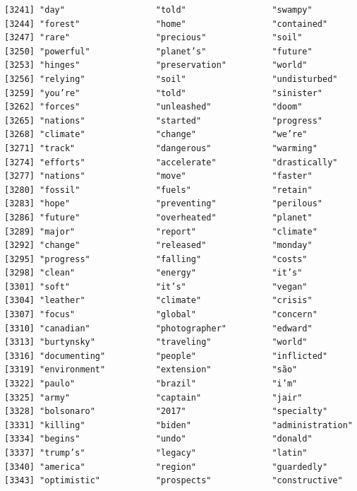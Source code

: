 \documentclass[
  letterpaper,
  DIV=11,
  numbers=noendperiod]{scrartcl}
\begin{document}
\begin{verbatim}
[3241] "day"                  "told"                 "swampy"              
[3244] "forest"               "home"                 "contained"           
[3247] "rare"                 "precious"             "soil"                
[3250] "powerful"             "planet’s"             "future"              
[3253] "hinges"               "preservation"         "world"               
[3256] "relying"              "soil"                 "undisturbed"         
[3259] "you’re"               "told"                 "sinister"            
[3262] "forces"               "unleashed"            "doom"                
[3265] "nations"              "started"              "progress"            
[3268] "climate"              "change"               "we’re"               
[3271] "track"                "dangerous"            "warming"             
[3274] "efforts"              "accelerate"           "drastically"         
[3277] "nations"              "move"                 "faster"              
[3280] "fossil"               "fuels"                "retain"              
[3283] "hope"                 "preventing"           "perilous"            
[3286] "future"               "overheated"           "planet"              
[3289] "major"                "report"               "climate"             
[3292] "change"               "released"             "monday"              
[3295] "progress"             "falling"              "costs"               
[3298] "clean"                "energy"               "it’s"                
[3301] "soft"                 "it’s"                 "vegan"               
[3304] "leather"              "climate"              "crisis"              
[3307] "focus"                "global"               "concern"             
[3310] "canadian"             "photographer"         "edward"              
[3313] "burtynsky"            "traveling"            "world"               
[3316] "documenting"          "people"               "inflicted"           
[3319] "environment"          "extension"            "são"                 
[3322] "paulo"                "brazil"               "i’m"                 
[3325] "army"                 "captain"              "jair"                
[3328] "bolsonaro"            "2017"                 "specialty"           
[3331] "killing"              "biden"                "administration"      
[3334] "begins"               "undo"                 "donald"              
[3337] "trump’s"              "legacy"               "latin"               
[3340] "america"              "region"               "guardedly"           
[3343] "optimistic"           "prospects"            "constructive"        

\end{verbatim}
\end{document}
